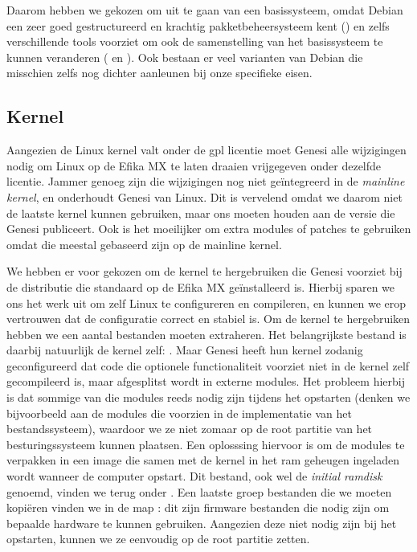 Daarom hebben we gekozen om uit te gaan van een  basissysteem, omdat Debian een zeer goed gestructureerd en krachtig pakketbeheersysteem kent () en zelfs verschillende tools voorziet om ook de samenstelling van het basissysteem te kunnen veranderen ( en ). Ook bestaan er veel varianten van Debian die misschien zelfs nog dichter aanleunen bij onze specifieke eisen.

\subsection{Kernel}
\label{kiosk:deployment:besturingssysteem:kernel}

Aangezien de Linux kernel valt onder de \ac{gpl} licentie moet Genesi alle wijzigingen nodig om Linux op de Efika MX te laten draaien vrijgegeven onder dezelfde licentie. Jammer genoeg zijn die wijzigingen nog niet geïntegreerd in de \emph{mainline kernel}, en onderhoudt Genesi  van Linux. Dit is vervelend omdat we daarom niet de laatste kernel kunnen gebruiken, maar ons moeten houden aan de versie die Genesi publiceert. Ook is het moeilijker om extra modules of patches te gebruiken omdat die meestal gebaseerd zijn op de mainline kernel.

We hebben er voor gekozen om de kernel te hergebruiken die Genesi voorziet bij de distributie die standaard op de Efika MX geïnstalleerd is. Hierbij sparen we ons het werk uit om zelf Linux te configureren en compileren, en kunnen we erop vertrouwen dat de configuratie correct en stabiel is. Om de kernel te hergebruiken hebben we een aantal bestanden moeten extraheren. Het belangrijkste bestand is daarbij natuurlijk de kernel zelf: . Maar Genesi heeft hun kernel zodanig geconfigureerd dat code die optionele functionaliteit voorziet niet in de kernel zelf gecompileerd is, maar afgesplitst wordt in externe modules. Het probleem hierbij is dat sommige van die modules reeds nodig zijn tijdens het opstarten (denken we bijvoorbeeld aan de modules die voorzien in de implementatie van het bestandssysteem), waardoor we ze niet zomaar op de root partitie van het besturingssysteem kunnen plaatsen. Een oplosssing hiervoor is om de modules te verpakken in een image die samen met de kernel in het \ac{ram} geheugen ingeladen wordt wanneer de computer opstart. Dit bestand, ook wel de \emph{initial ramdisk} genoemd, vinden we terug onder . Een laatste groep bestanden die we moeten kopiëren vinden we in de map : dit zijn firmware bestanden die nodig zijn om bepaalde hardware te kunnen gebruiken. Aangezien deze niet nodig zijn bij het opstarten, kunnen we ze eenvoudig op de root partitie zetten.

